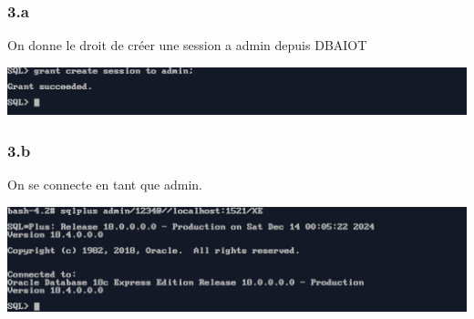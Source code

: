 \subsubsection*{3.a}
On donne le droit de créer une session a admin depuis DBAIOT



\begin{center}
    \includegraphics[width=\textwidth]{ScreenShot/Partie4/grantsession.png}
\end{center}

\subsubsection*{3.b}
On se connecte en tant que admin.



\begin{center}
    \includegraphics[width=\textwidth]{ScreenShot/Partie4/connect2.png}
\end{center}


